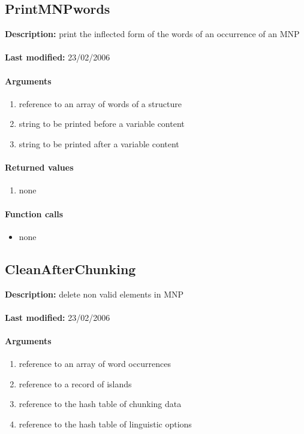 \subsection{PrintMNPwords}
\textbf{Description:} print the inflected form of the words of an occurrence of an MNP\\
\\\textbf{Last modified:} 23/02/2006

\paragraph{Arguments}
\begin{enumerate}
\item reference to an array of words of a structure
\item string to be printed before a variable content
\item string to be printed after a variable content
\end{enumerate}

\paragraph{Returned values}
\begin{enumerate}
\item none
\end{enumerate}

\paragraph{Function calls}
\begin{itemize}
\item none
\end{itemize}

\subsection{CleanAfterChunking}
\textbf{Description:} delete non valid elements in MNP\\
\\\textbf{Last modified:} 23/02/2006

\paragraph{Arguments}
\begin{enumerate}
\item reference to an array of word occurrences
\item reference to a record of islands
\item reference to the hash table of chunking data
\item reference to the hash table of linguistic options
\end{enumerate}

